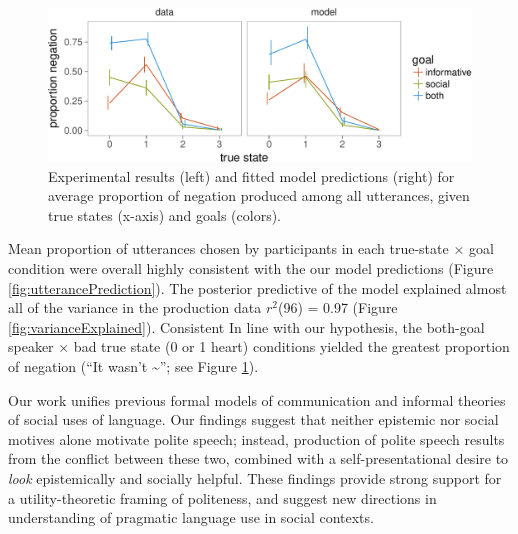 \documentclass[12pt]{article}
\begin{document}
\begin{figure}
\centering
\includegraphics{politeness_files/figure-latex/negationPrediction-1.pdf}
\caption{\label{fig:negationPrediction}Experimental results (left) and
fitted model predictions (right) for average proportion of negation
produced among all utterances, given true states (x-axis) and goals
(colors).}
\end{figure}

Mean proportion of utterances chosen by participants in each true-state
\(\times\) goal condition were overall highly consistent with the our
model predictions (Figure \ref{fig:utterancePrediction}). The posterior
predictive of the model explained almost all of the variance in the
production data \(r^2\)(96) = 0.97 (Figure \ref{fig:varianceExplained}).
Consistent In line with our hypothesis, the both-goal speaker \(\times\)
bad true state (0 or 1 heart) conditions yielded the greatest proportion
of negation (\enquote{It wasn't \textasciitilde{}}; see Figure
\ref{fig:negationPrediction}).

Our work unifies previous formal models of communication and informal
theories of social uses of language. Our findings suggest that neither
epistemic nor social motives alone motivate polite speech; instead,
production of polite speech results from the conflict between these two,
combined with a self-presentational desire to \emph{look} epistemically
and socially helpful. These findings provide strong support for a
utility-theoretic framing of politeness, and suggest new directions in
understanding of pragmatic language use in social contexts.


\end{document}
